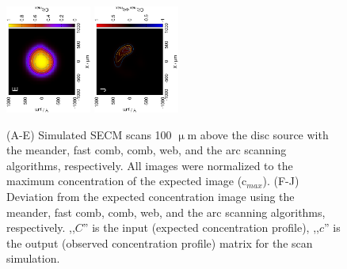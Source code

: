 \begin{figure}[H]
\includegraphics[trim = 20mm 30mm 0mm 20mm, clip, width=0.25\textwidth, angle=-90]{img/sim/arc_sim.eps} \includegraphics[trim = 20mm 30mm 0mm 20mm, clip, width=0.25\textwidth, angle=-90]{img/sim/arc_delta.eps}

\caption[Simulated SECM scans 100 $\upmu$m above the disc source and deviation from the original images.]{(A-E) Simulated SECM scans 100 $\upmu$m above the disc source with the meander, fast comb, comb, web, and the arc scanning algorithms, respectively.
All images were normalized to the maximum concentration of the expected image (c$_{max}$).
(F-J) Deviation from the expected concentration image using the meander, fast comb, comb, web, and the arc scanning algorithms, respectively.
,,$C$'' is the input (expected concentration profile), ,,$c$'' is the output (observed concentration profile) matrix for the scan simulation.}
\label{fig:simulations}
\end{figure}

